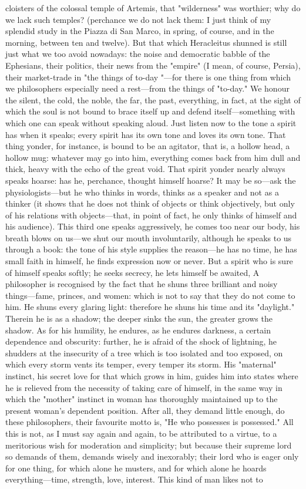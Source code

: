 \documentclass[12pt]{article}
\begin{document}
cloisters of the colossal temple of Artemis, that "wilderness" was worthier; why do we lack such temples? (perchance we do not lack them: I just think of my splendid study in the Piazza di San Marco, in spring, of course, and in the morning, between ten and twelve). But that which Heracleitus shunned is still just what we too avoid nowadays: the noise and democratic babble of the Ephesians, their politics, their news from the "empire" (I mean, of course, Persia), their market-trade in "the things of to-day "---for there is one thing from which we philosophers especially need a rest---from the things of "to-day." We honour the silent, the cold, the noble, the far, the past, everything, in fact, at the sight of which the soul is not bound to brace itself up and defend itself---something with which one can speak without speaking aloud. Just listen now to the tone a spirit has when it speaks; every spirit has its own tone and loves its own tone. That thing yonder, for instance, is bound to be an agitator, that is, a hollow head, a hollow mug: whatever may go into him, everything comes back from him dull and thick, heavy with the echo of the great void. That spirit yonder nearly always speaks hoarse: has he, perchance, thought himself hoarse? It may be so---ask the physiologists---but he who thinks in words, thinks as a speaker and not as a thinker (it shows that he does not think of objects or think objectively, but only of his relations with objects---that, in point of fact, he only thinks of himself and his audience). This third one speaks aggressively, he comes too near our body, his breath blows on us---we shut our mouth involuntarily, although he speaks to us through a book: the tone of his style supplies the reason---he has no time, he has small faith in himself, he finds expression now or never. But a spirit who is sure of himself speaks softly; he seeks secrecy, he lets himself be awaited, A philosopher is recognised by the fact that he shuns three brilliant and noisy things---fame, princes, and women: which is not to say that they do not come to him. He shuns every glaring light: therefore he shuns his time and its "daylight." Therein he is as a shadow; the deeper sinks the sun, the greater grows the shadow. As for his humility, he endures, as he endures darkness, a certain dependence and obscurity: further, he is afraid of the shock of lightning, he shudders at the insecurity of a tree which is too isolated and too exposed, on which every storm vents its temper, every temper its storm. His "maternal" instinct, his secret love for that which grows in him, guides him into states where he is relieved from the necessity of taking care of himself, in the same way in which the "mother" instinct in woman has thoroughly maintained up to the present woman's dependent position. After all, they demand little enough, do these philosophers, their favourite motto is, "He who possesses is possessed." All this is not, as I must say again and again, to be attributed to a virtue, to a meritorious wish for moderation and simplicity; but because their supreme lord so demands of them, demands wisely and inexorably; their lord who is eager only for one thing, for which alone he musters, and for which alone he hoards everything---time, strength, love, interest. This kind of man likes not to 
\end{document}
